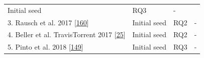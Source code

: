\documentclass[]{book}
\begin{document}
\begin{longtable}[]{@{}llll@{}}
\begin{minipage}[t]{0.20\columnwidth}
Initial seed\strut
\end{minipage} & \begin{minipage}[t]{0.14\columnwidth}\raggedright\strut
RQ3\strut
\end{minipage} & \begin{minipage}[t]{0.06\columnwidth}\raggedright\strut
-\strut
\end{minipage}\tabularnewline
\begin{minipage}[t]{0.48\columnwidth}\raggedright\strut
3. Rausch et al. 2017
{[}\protect\hyperlink{ref-rausch2017empirical}{160}{]}\strut
\end{minipage} & \begin{minipage}[t]{0.20\columnwidth}\raggedright\strut
Initial seed\strut
\end{minipage} & \begin{minipage}[t]{0.14\columnwidth}\raggedright\strut
RQ2\strut
\end{minipage} & \begin{minipage}[t]{0.06\columnwidth}\raggedright\strut
-\strut
\end{minipage}\tabularnewline
\begin{minipage}[t]{0.48\columnwidth}\raggedright\strut
4. Beller et al. TravisTorrent 2017
{[}\protect\hyperlink{ref-beller2017travistorrent}{25}{]}\strut
\end{minipage} & \begin{minipage}[t]{0.20\columnwidth}\raggedright\strut
Initial seed\strut
\end{minipage} & \begin{minipage}[t]{0.14\columnwidth}\raggedright\strut
RQ2\strut
\end{minipage} & \begin{minipage}[t]{0.06\columnwidth}\raggedright\strut
-\strut
\end{minipage}\tabularnewline
\begin{minipage}[t]{0.48\columnwidth}\raggedright\strut
5. Pinto et al. 2018
{[}\protect\hyperlink{ref-pinto2018work}{149}{]}\strut
\end{minipage} & \begin{minipage}[t]{0.20\columnwidth}\raggedright\strut
Initial seed\strut
\end{minipage} & \begin{minipage}[t]{0.14\columnwidth}\raggedright\strut
RQ3\strut
\end{minipage} & \begin{minipage}[t]{0.06\columnwidth}\raggedright\strut
-\strut
\end{minipage}\tabularnewline

\end{longtable}
\end{document}
